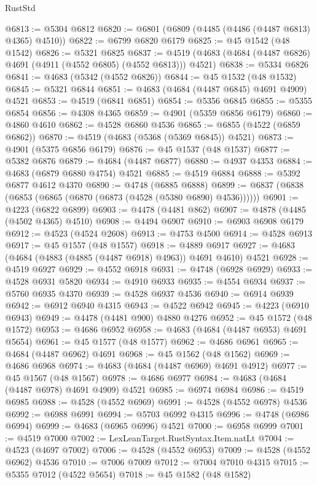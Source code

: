 \begin{lexlean}{RustStd}
\begin{coremodule}
@6813 := @5304 @6812
@6820 := @6801 (@6809 (@4485 (@4486 (@4487 @6813) @4365) @4510))
@6822 := @6799 @6820 @6179
@6825 := @45 @1542 (@48 @1542)
@6826 := @5321 @6825
@6837 := @4519 (@4683 (@4684 (@4487 @6826) @4691 (@4911 (@4552 @6805) (@4552 @6813))) @4521)
@6838 := @5334 @6826
@6841 := @4683 (@5342 (@4552 @6826))
@6844 := @45 @1532 (@48 @1532)
@6845 := @5321 @6844
@6851 := @4683 (@4684 (@4487 @6845) @4691 @4909) @4521
@6853 := @4519 (@6841 @6851)
@6854 := @5356 @6845
@6855 := @5355 @6854
@6856 := @4308 @4365
@6859 := @4901 (@5359 @6856 @6179)
@6860 := @4860 @4610
@6862 := @4528 @6860 @4536
@6865 := @6855 (@4522 (@6859 @6862))
@6870 := @4519 (@4683 (@5368 (@5369 @6845)) @4521)
@6873 := @4901 (@5375 @6856 @6179)
@6876 := @45 @1537 (@48 @1537)
@6877 := @5382 @6876
@6879 := @4684 (@4487 @6877)
@6880 := @4937 @4353
@6884 := @4683 (@6879 @6880 @4754) @4521
@6885 := @4519 @6884
@6888 := @5392 @6877 @4612 @4370
@6890 := @4748 (@6885 @6888)
@6899 := @6837 (@6838 (@6853 (@6865 (@6870 (@6873 (@4528 (@5380 @6890) @4536))))))
@6901 := @4223 (@6822 @6899)
@6903 := @4478 (@4481 @862)
@6907 := @4878 (@4485 (@4502 @4365) @4510)
@6908 := @4494 @6907
@6910 := @6903 @6908 @6179
@6912 := @4523 (@4524 @2608)
@6913 := @4753 @4500
@6914 := @4528 @6913
@6917 := @45 @1557 (@48 @1557)
@6918 := @4889 @6917
@6927 := @4683 (@4684 (@4883 (@4885 (@4487 @6918) @4963)) @4691 @4610) @4521
@6928 := @4519 @6927
@6929 := @4552 @6918
@6931 := @4748 (@6928 @6929)
@6933 := @4528 @6931 @5820
@6934 := @4910 @6933
@6935 := @4554 @6934
@6937 := @5760 @6935 @4370
@6939 := @4528 @6937 @4536
@6940 := @6914 @6939
@6942 := @6912 @6940 @4315
@6943 := @4522 @6942
@6945 := @4223 (@6910 @6943)
@6949 := @4478 (@4481 @900) @4880 @4276
@6952 := @45 @1572 (@48 @1572)
@6953 := @4686 @6952
@6958 := @4683 (@4684 (@4487 @6953) @4691 @5654)
@6961 := @45 @1577 (@48 @1577)
@6962 := @4686 @6961
@6965 := @4684 (@4487 @6962) @4691
@6968 := @45 @1562 (@48 @1562)
@6969 := @4686 @6968
@6974 := @4683 (@4684 (@4487 @6969) @4691 @4912)
@6977 := @45 @1567 (@48 @1567)
@6978 := @4686 @6977
@6984 := @4683 (@4684 (@4487 @6978) @4691 @4909) @4521
@6985 := @6974 @6984
@6986 := @4519 @6985
@6988 := @4528 (@4552 @6969)
@6991 := @4528 (@4552 @6978) @4536
@6992 := @6988 @6991
@6994 := @5703 @6992 @4315
@6996 := @4748 (@6986 @6994)
@6999 := @4683 (@6965 @6996) @4521
@7000 := @6958 @6999
@7001 := @4519 @7000
@7002 := LexLeanTarget.RustSyntax.Item.natLt
@7004 := @4523 (@4697 @7002)
@7006 := @4528 (@4552 @6953)
@7009 := @4528 (@4552 @6962) @4536
@7010 := @7006 @7009
@7012 := @7004 @7010 @4315
@7015 := @5355 @7012 (@4522 @5654)
@7018 := @45 @1582 (@48 @1582)

\end{coremodule}
\end{lexlean}
